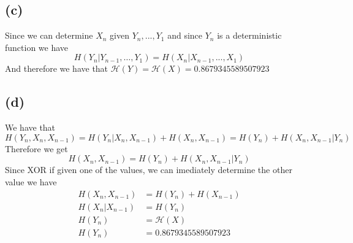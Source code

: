 \subsection*{(c)}
Since we can determine $X_n$ given $Y_n,...,Y_1$ and since 
$Y_n$ is a deterministic function we have
$$H(Y_n|Y_{n-1},\dots,Y_1)=H(X_{n}|X_{n-1},...,X_1)$$
And therefore we have that 
$\mathcal{H}(Y)=\mathcal{H}(X)=\boxed{0.8679345589507923}$
\subsection*{(d)}
We have that 
$$H(Y_n,X_n,X_{n-1})=H(Y_n|X_n,X_{n-1})+H(X_n,X_{n-1})=H(Y_n)+H(X_n,X_{n-1}|Y_n)$$
Therefore we get 
$$H(X_n,X_{n-1})=H(Y_n)+H(X_n,X_{n-1}|Y_n)$$
Since XOR if given one of the values, we can imediately determine the other
value we have 
\begin{align*}
    H(X_n,X_{n-1})&=H(Y_n)+H(X_{n-1})\\
    H(X_n|X_{n-1})&=H(Y_n)\\
    H(Y_n)&=\mathcal{H}(X)\\
    H(Y_n)&=\boxed{0.8679345589507923}
\end{align*}



